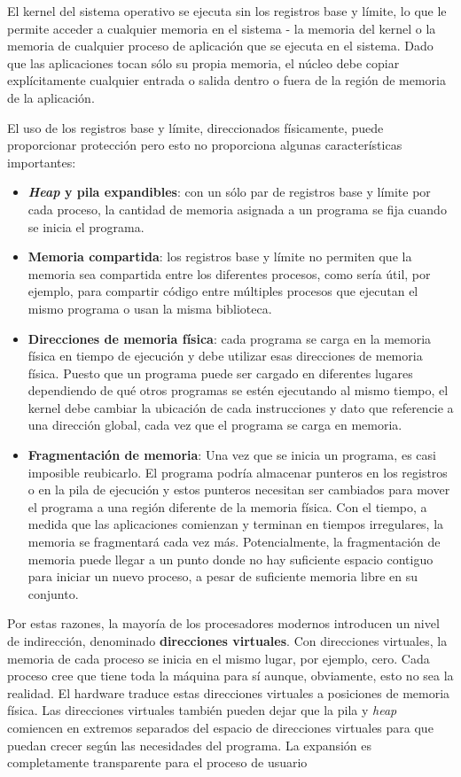 \documentclass[10pt]{book}
\begin{document}
El kernel del sistema operativo se ejecuta sin los registros base y límite, lo que le permite acceder a cualquier memoria en el sistema - la memoria del kernel o la memoria de cualquier proceso de aplicación que se ejecuta en el sistema. Dado que las aplicaciones tocan sólo su propia memoria, el núcleo debe copiar explícitamente cualquier entrada o salida dentro o fuera de la región de memoria de la aplicación.

El uso de los registros base y límite, direccionados físicamente, puede proporcionar protección pero esto no proporciona algunas características importantes:

\begin{itemize}
\item \textbf{\textit{Heap} y pila expandibles}: con un sólo par de registros base y límite por cada proceso, la cantidad de memoria asignada a un programa se fija cuando se inicia el programa.
\item \textbf{Memoria compartida}: los registros base y límite no permiten que la memoria sea compartida entre los diferentes procesos, como sería útil, por ejemplo, para compartir código entre múltiples procesos que ejecutan el mismo programa o usan la misma biblioteca.
\item \textbf{Direcciones de memoria física}: cada programa se carga en la memoria física en tiempo de ejecución y debe utilizar esas direcciones de memoria física. Puesto que un programa puede ser cargado en diferentes lugares dependiendo de qué otros programas se estén ejecutando al mismo tiempo, el kernel debe cambiar la ubicación de cada instrucciones y dato que referencie a una dirección global, cada vez que el programa se carga en memoria.
\item \textbf{Fragmentación de memoria}: Una vez que se inicia un programa, es casi imposible reubicarlo. El programa podría almacenar punteros en los registros o en la pila de ejecución y estos punteros necesitan ser cambiados para mover el programa a una región diferente de la memoria física. Con el tiempo, a medida que las aplicaciones comienzan y terminan en tiempos irregulares, la memoria se fragmentará cada vez más. Potencialmente, la fragmentación de memoria puede llegar a un punto donde no hay suficiente espacio contiguo para iniciar un nuevo proceso, a pesar de suficiente memoria libre en su conjunto.
\end{itemize}

Por estas razones, la mayoría de los procesadores modernos introducen un nivel de indirección, denominado \textbf{direcciones virtuales}. Con direcciones virtuales, la memoria de cada proceso se inicia en el mismo lugar, por ejemplo, cero. Cada proceso cree que tiene toda la máquina para sí aunque, obviamente, esto no sea la realidad. El hardware traduce estas direcciones virtuales a posiciones de memoria física. Las direcciones virtuales también pueden dejar que la pila y \textit{heap} comiencen en extremos separados del espacio de direcciones virtuales para que puedan crecer según las necesidades del programa. La expansión es completamente transparente para el proceso de usuario
 
\end{document}
